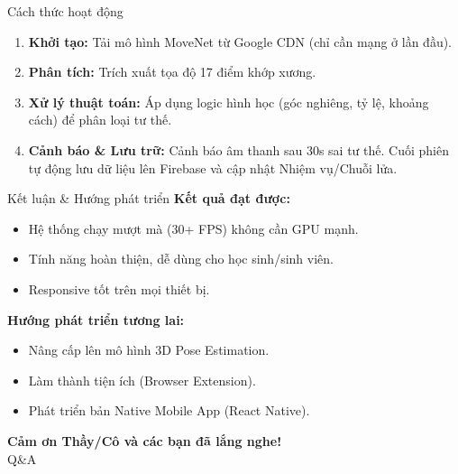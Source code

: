 \documentclass{beamer}
\begin{document}
\begin{frame}{Cách thức hoạt động}
    \begin{enumerate}
        \item \textbf{Khởi tạo:} Tải mô hình MoveNet từ Google CDN (chỉ cần mạng ở lần đầu).
        \item \textbf{Phân tích:} Trích xuất tọa độ 17 điểm khớp xương.
        \item \textbf{Xử lý thuật toán:} Áp dụng logic hình học (góc nghiêng, tỷ lệ, khoảng cách) để phân loại tư thế.
        \item \textbf{Cảnh báo \& Lưu trữ:} Cảnh báo âm thanh sau 30s sai tư thế. Cuối phiên tự động lưu dữ liệu lên Firebase và cập nhật Nhiệm vụ/Chuỗi lửa.
    \end{enumerate}
\end{frame}

\begin{frame}{Kết luận \& Hướng phát triển}
    \textbf{Kết quả đạt được:}
    \begin{itemize}
        \item Hệ thống chạy mượt mà (30+ FPS) không cần GPU mạnh.
        \item Tính năng hoàn thiện, dễ dùng cho học sinh/sinh viên.
        \item Responsive tốt trên mọi thiết bị.
    \end{itemize}
    \vspace{0.5cm}
    \textbf{Hướng phát triển tương lai:}
    \begin{itemize}
        \item Nâng cấp lên mô hình 3D Pose Estimation.
        \item Làm thành tiện ích (Browser Extension).
        \item Phát triển bản Native Mobile App (React Native).
    \end{itemize}
\end{frame}

\begin{frame}
    \centering
    \Huge \textbf{Cảm ơn Thầy/Cô và các bạn đã lắng nghe!}\\
    \vspace{1cm}
    \large Q\&A
\end{frame}
\end{document}

